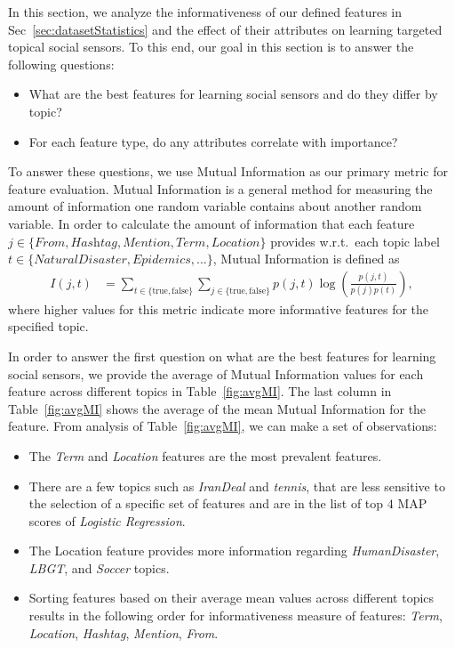 In this section, we analyze the informativeness of our defined
features in Sec~\ref{sec:datasetStatistics} and the effect of their
attributes on learning targeted topical social sensors. To this end,
our goal in this section is to answer the following questions:
\begin{itemize}
\item What are the best features for learning social sensors and do they differ by topic?
\item For each feature type, do any attributes correlate with importance?
\end{itemize}
To answer these questions, we use Mutual Information as our primary
metric for feature evaluation.  Mutual Information is a general method
for measuring the amount of information one random variable contains
about another random variable.  In order to calculate the amount of
information that each feature
$j \in \{ \textit{From}, \textit{Hashtag}, \textit{Mention}, \textit{Term}, \textit{Location} \}$
provides w.r.t.\ each topic label $t \in \{NaturalDisaster, Epidemics,...\}$,
Mutual Information is defined as 
\begin{align*}
I(j, t) & = \!\!\! \sum_{t \in \{ \mathrm{true}, \mathrm{false} \}} \sum_{j \in \{ \mathrm{true}, \mathrm{false}\}}p(j,t)\log \left ( \frac{p(j,t)}{p(j)p(t)} \right ) , 
 \label{eq:eq1}
\end{align*}
where higher values for this metric indicate more informative features for the specified topic.

In order to answer the first question on what are the best features
for learning social sensors, we provide the average of Mutual Information
values for each feature across different topics in Table~\ref{fig:avgMI}.
The last column in Table~\ref{fig:avgMI} shows the
average of the mean Mutual Information for the feature. From analysis of
Table~\ref{fig:avgMI}, we can make a set of observations:

\begin{itemize}
\item The \textit{Term} and \textit{Location} features are the most prevalent features.%
\item There are a few topics such as \textit{IranDeal} and \textit{tennis}, that are less sensitive to the selection of a specific set of features and are in the list of top $4$ MAP scores of \textit{Logistic Regression}.%
\item The Location feature provides more information regarding \textit{HumanDisaster}, \textit{LBGT}, and \textit{Soccer} topics.
\item Sorting features based on their average mean values across different topics results in the following order for informativeness measure of features: \textit{Term}, \textit{Location}, \textit{Hashtag}, \textit{Mention}, \textit{From}.
\end{itemize}

